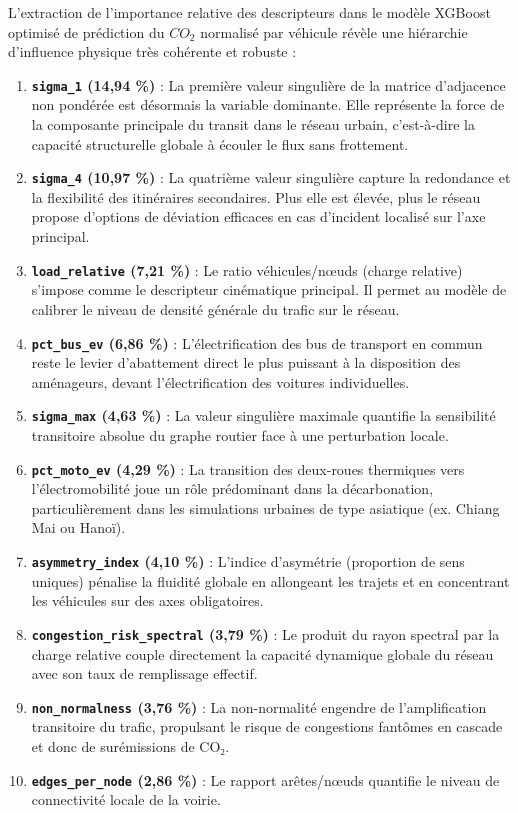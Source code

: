 \documentclass[10pt, a4paper]{article}
\providecommand{\tightlist}{}
\begin{document}
L'extraction de l'importance relative des descripteurs dans le modèle
XGBoost optimisé de prédiction du \(CO_2\) normalisé par véhicule révèle
une hiérarchie d'influence physique très cohérente et robuste :

\begin{enumerate}
\def\labelenumi{\arabic{enumi}.}
\tightlist
\item
  \textbf{\texttt{sigma\_1} (14,94 \%)} : La première valeur singulière
  de la matrice d'adjacence non pondérée est désormais la variable
  dominante. Elle représente la force de la composante principale du
  transit dans le réseau urbain, c'est-à-dire la capacité structurelle
  globale à écouler le flux sans frottement.
\item
  \textbf{\texttt{sigma\_4} (10,97 \%)} : La quatrième valeur singulière
  capture la redondance et la flexibilité des itinéraires secondaires.
  Plus elle est élevée, plus le réseau propose d'options de déviation
  efficaces en cas d'incident localisé sur l'axe principal.
\item
  \textbf{\texttt{load\_relative} (7,21 \%)} : Le ratio véhicules/nœuds
  (charge relative) s'impose comme le descripteur cinématique principal.
  Il permet au modèle de calibrer le niveau de densité générale du
  trafic sur le réseau.
\item
  \textbf{\texttt{pct\_bus\_ev} (6,86 \%)} : L'électrification des bus
  de transport en commun reste le levier d'abattement direct le plus
  puissant à la disposition des aménageurs, devant l'électrification des
  voitures individuelles.
\item
  \textbf{\texttt{sigma\_max} (4,63 \%)} : La valeur singulière maximale
  quantifie la sensibilité transitoire absolue du graphe routier face à
  une perturbation locale.
\item
  \textbf{\texttt{pct\_moto\_ev} (4,29 \%)} : La transition des
  deux-roues thermiques vers l'électromobilité joue un rôle prédominant
  dans la décarbonation, particulièrement dans les simulations urbaines
  de type asiatique (ex. Chiang Mai ou Hanoï).
\item
  \textbf{\texttt{asymmetry\_index} (4,10 \%)} : L'indice d'asymétrie
  (proportion de sens uniques) pénalise la fluidité globale en
  allongeant les trajets et en concentrant les véhicules sur des axes
  obligatoires.
\item
  \textbf{\texttt{congestion\_risk\_spectral} (3,79 \%)} : Le produit du
  rayon spectral par la charge relative couple directement la capacité
  dynamique globale du réseau avec son taux de remplissage effectif.
\item
  \textbf{\texttt{non\_normalness} (3,76 \%)} : La non-normalité
  engendre de l'amplification transitoire du trafic, propulsant le
  risque de congestions fantômes en cascade et donc de surémissions de
  CO₂.
\item
  \textbf{\texttt{edges\_per\_node} (2,86 \%)} : Le rapport arêtes/nœuds
  quantifie le niveau de connectivité locale de la voirie.
\end{enumerate}
\end{document}

